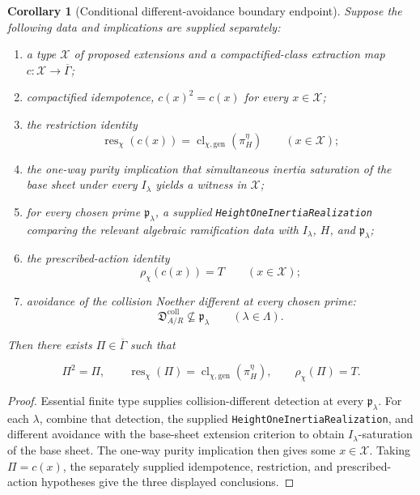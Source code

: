 \documentclass[11pt]{article}
\newtheorem{corollary}[theorem]{Corollary}
\theoremstyle{definition}
\theoremstyle{remark}
\newcommand{\Gbar}{\overline{\Gamma}}
\newcommand{\leanpath}[1]{\texttt{\nolinkurl{#1}}}
\begin{document}
\begin{corollary}[Conditional different-avoidance boundary endpoint]
\label{cor:conditional-boundary}
Suppose the following data and implications are supplied separately:

\begin{enumerate}[label=\textup{(\roman*)},leftmargin=2.6em]
  \item a type \(\mathcal X\) of proposed extensions and a compactified-class
        extraction map \(c:\mathcal X\to\Gbar\);
  \item compactified idempotence, \(c(x)^2=c(x)\) for every
        \(x\in\mathcal X\);
  \item the restriction identity
        \[
          \operatorname{res}_{\chi}(c(x))
          =\operatorname{cl}_{\chi,\mathrm{gen}}(\pi_H^\eta)
          \qquad(x\in\mathcal X);
        \]
  \item the one-way purity implication that simultaneous inertia saturation
        of the base sheet under every \(I_\lambda\) yields a witness in
        \(\mathcal X\);
  \item for every chosen prime \(\mathfrak p_\lambda\), a supplied
        \leanpath{HeightOneInertiaRealization} comparing the relevant
        algebraic ramification data with \(I_\lambda\), \(H\), and
        \(\mathfrak p_\lambda\);
  \item the prescribed-action identity
        \[
          \rho_{\chi}(c(x))=T
          \qquad(x\in\mathcal X);
        \]
  \item avoidance of the collision Noether different at every chosen prime:
        \[
          \mathfrak D_{A/R}^{\mathrm{coll}}\not\subseteq \mathfrak p_\lambda
          \qquad(\lambda\in\Lambda).
        \]
\end{enumerate}

Then there exists \(\Pi\in\Gbar\) such that

\[
  \Pi^2=\Pi,
  \qquad
  \operatorname{res}_{\chi}(\Pi)
    =\operatorname{cl}_{\chi,\mathrm{gen}}(\pi_H^\eta),
  \qquad
  \rho_{\chi}(\Pi)=T.
\]
\end{corollary}

\begin{proof}
Essential finite type supplies collision-different detection at every
\(\mathfrak p_\lambda\).  For each \(\lambda\), combine that detection, the supplied
\leanpath{HeightOneInertiaRealization}, and different avoidance with the
base-sheet extension criterion to obtain \(I_\lambda\)-saturation of the
base sheet.  The one-way purity implication then gives some
\(x\in\mathcal X\).
Taking \(\Pi=c(x)\), the separately supplied idempotence, restriction, and
prescribed-action hypotheses give the three displayed conclusions.
\end{proof}
\end{document}
